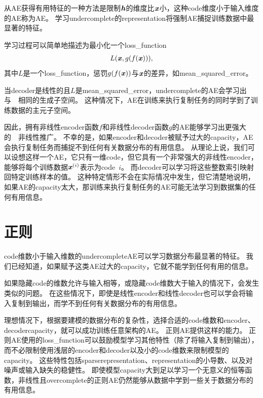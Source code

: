 从\gls{AE}获得有用特征的一种方法是限制$\boldsymbol{\mathit{h}}$的维度比$\boldsymbol{\mathit{x}}$小，这种\gls{code}维度小于输入维度的\gls{AE}称为\gls{AE}。
学习\gls{undercomplete}的\gls{representation}将强制\gls{AE}捕捉训练数据中最显著的特征。


学习过程可以简单地描述为最小化一个\gls{loss_function} 
\begin{align}
    L(\boldsymbol{\mathit{x}}, g(f(\boldsymbol{\mathit{x}}))),
\end{align}
其中$L$是一个\gls{loss_function}，惩罚$g(f(\boldsymbol{\mathit{x}}))$与$\boldsymbol{\mathit{x}}$的差异，如\gls{mean_squared_error}。


当\gls{decoder}是线性的且$L$是\gls{mean_squared_error}，\gls{undercomplete}的\gls{AE}会学习出与~~相同的生成子空间。
这种情况下，\gls{AE}在训练来执行复制任务的同时学到了训练数据的主元子空间。


因此，拥有非线性\gls{encoder}函数$f$和非线性\gls{decoder}函数$g$的\gls{AE}能够学习出更强大的~~非线性推广。
不幸的是，如果\gls{encoder}和\gls{decoder}被赋予过大的\gls{capacity}，\gls{AE}会执行复制任务而捕捉不到任何有关数据分布的有用信息。
从理论上说，我们可以设想这样一个\gls{AE}，它只有一维\gls{code}，但它具有一个非常强大的非线性\gls{encoder}，能够将每个训练数据$\boldsymbol{\mathit{x}}^{(i)}$表示为\gls{code}~$i$。
而\gls{decoder}可以学习将这些整数索引映射回特定训练样本的值。
这种特定情形不会在实际情况中发生，但它清楚地说明，如果\gls{AE}的\gls{capacity}太大，那训练来执行复制任务的\gls{AE}可能无法学习到数据集的任何有用信息。


\section{正则}
\label{sec:regularized_autoencoders}
\gls{code}维数小于输入维数的\gls{undercomplete}\gls{AE}可以学习数据分布最显著的特征。
我们已经知道，如果赋予这类\gls{AE}过大的\gls{capacity}，它就不能学到任何有用的信息。


如果隐藏\gls{code}的维数允许与输入相等，或隐藏\gls{code}维数大于输入的情况下，会发生类似的问题。
在这些情况下，即使是线性\gls{encoder}和线性\gls{decoder}也可以学会将输入复制到输出，而学不到任何有关数据分布的有用信息。


理想情况下，根据要建模的数据分布的复杂性，选择合适的\gls{code}维数和\gls{encoder}、\gls{decoder}\gls{capacity}，就可以成功训练任意架构的\gls{AE}。
正则\gls{AE}提供这样的能力。
正则\gls{AE}使用的\gls{loss_function}可以鼓励模型学习其他特性（除了将输入复制到输出），而不必限制使用浅层的\gls{encoder}和\gls{decoder}以及小的\gls{code}维数来限制模型的\gls{capacity}。
这些特性包括\gls{sparse}\gls{representation}、\gls{representation}的小导数、以及对噪声或输入缺失的稳健性。
即使模型\gls{capacity}大到足以学习一个无意义的恒等函数，非线性且\gls{overcomplete}的正则\gls{AE}仍然能够从数据中学到一些关于数据分布的有用信息。



